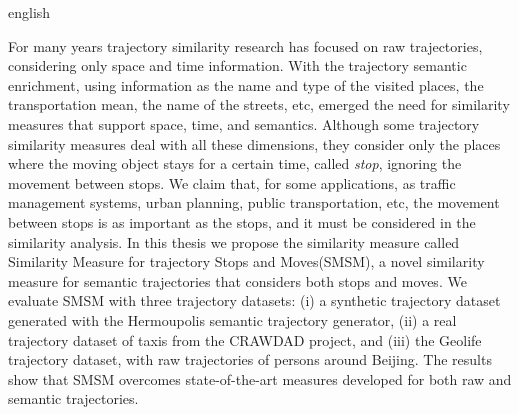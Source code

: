 {
    \begin{otherlanguage*}{english}
    \begin{resumo}[Abstract]

        For many years trajectory similarity research has focused on raw trajectories, considering only space and time information. With the trajectory semantic enrichment, using information as the name and type of the visited places, the transportation mean, the name of the streets, etc,  emerged the need for similarity measures that support space, time, and semantics. Although some trajectory similarity measures deal with all these dimensions, they consider only the places where the moving object stays for a certain time, called \emph{stop}, ignoring the movement between stops. We claim that, for some applications, as traffic management systems, urban planning, public transportation, etc, the movement between stops is as important as the stops, and it must be considered in the similarity analysis.
        In this thesis we propose the similarity measure called Similarity Measure for trajectory Stops and Moves(SMSM), a novel similarity measure for semantic trajectories that considers both stops and moves.
        We evaluate SMSM with three trajectory datasets: (i) a synthetic trajectory dataset generated with the Hermoupolis semantic trajectory generator, (ii) a real trajectory dataset {of taxis} from the CRAWDAD project, and (iii) {the Geolife trajectory dataset, with raw trajectories of persons around Beijing}. The results show that SMSM overcomes state-of-the-art measures developed for both raw and semantic trajectories.


    \end{resumo}
    \end{otherlanguage*}
}